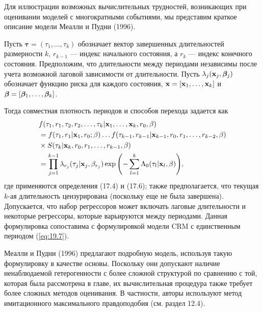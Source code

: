 \noindent
Для иллюстрации возможных вычислительных трудностей, возникающих при оценивании моделей с многократными событиями, мы представим краткое описание модели Меалли и Пудни (1996).

Пусть $\bm{\tau} = (\tau_1, \ldots , \tau_k)$ обозначает вектор завершенных длительностей размерности $k$, $r_{k-1}$ --- индекс начального состояния, а $r_k$ --- индекс конечного состояния. Предположим, что длительности между периодами независимы после учета возможной лаговой зависимости от длительности. Пусть $\lambda_j(\mathbf{x}_j, \bm{\beta}_j)$ обозначает функцию риска для каждого состояния, $\mathbf{x} = [\mathbf{x}_1, \ldots , \mathbf{x}_k]$ и $\bm{\beta} = [\bm{\beta}_1, \ldots , \bm{\beta}_k]$.

Тогда совместная плотность периодов и способов перехода задается как
        \begin{align}\label{eq:19.26}
        &f(\tau_1, r_1, \tau_2, r_2,\ldots , \tau_k|\mathbf{x}_1,\ldots , \mathbf{x}_k,r_0,\beta) \\
        &= f(\tau_1, r_1|\mathbf{x}_1,r_0;\beta)\ldots f(\tau_{k-1},r_{k-1}|\mathbf{x}_{k-1}, r_0, r_1,\ldots , r_{k-2},\beta) \notag \\
        &\times S(\tau_k|\mathbf{x}_k,r_0,r_1,\ldots , r_{k-1}, \beta) \notag \\
        &= \prod^{k-1}_{j=1} \lambda_{r_j}(\tau_j|\mathbf{x}_j,\beta_{r_j}) \exp{\left(-\sum^{k}_{l=1} \Lambda_0(\tau_l|\mathbf{x}_l,\beta) \right)}, \notag
        \end{align}
где применяются определения (17.4) %
и (17.6); %
также предполагается, что текущая $k$-ая длительность цензурирована (поскольку еще не была завершена).
Допускается, что набор регрессоров может включать лаговые длительности и некоторые регрессоры, которые варьируются между периодами. Данная формулировка сопоставима с формулировкой модели CRM с единственным периодом (\ref{eq:19.7}).

Меалли и Пудни (1996) предлагают подробную модель, используя такую формулировку в качестве основы. Поскольку они допускают наличие ненаблюдаемой гетерогенности с более сложной структурой по сравнению с той, которая была рассмотрена в главе, их вычислительная процедура также требует более сложных методов оценивания. В частности, авторы используют метод имитационного максимального правдоподобия (см. раздел 12.4). %




